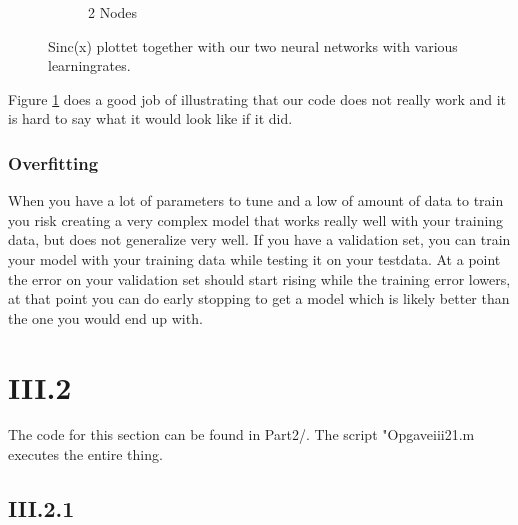 \documentclass{article}
\begin{document}
\begin{figure}
\begin{subfigure}[b]{0.49\textwidth}
        \caption{2 Nodes} 
        \label{fig:plot2}
    \end{subfigure}
    \caption{Sinc(x) plottet together with our two neural networks with
    various learningrates.}
    \label{}
\end{figure}

Figure \ref{fig:plot2} does a good job of illustrating that our code does
not really work and it is hard to say what it would look like if it did.

\subsubsection{Overfitting}

When you have a lot of parameters to tune and a low of amount of data to
train you risk creating a very complex model that works really well with
your training data, but does not generalize very well. If you have a
validation set, you can train your model with your training data while
testing it on your testdata. At a point the error on your validation set
should start rising while the training error lowers, at that point you can
do early stopping to get a model which is likely better than the one you
would end up with.

\section{III.2}

The code for this section can be found in Part2/. The script
"Opgaveiii21.m executes the entire thing.

\subsection{III.2.1}
\end{document}
